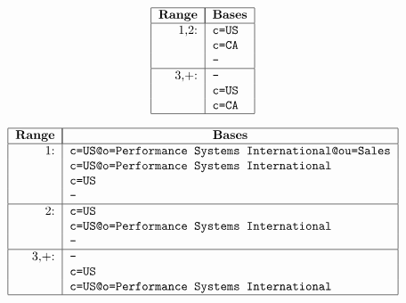 \begin{bwslide}

\[\begin{tabular}{|r|l|}
\hline
\multicolumn{1}{|c|}{\bf Range}&
		\multicolumn{1}{|c|}{\bf Bases}\\
\hline
1,2:&		\tt c=US\\
&		\tt c=CA\\
&		\tt -\\
\hline
3,+:&		\tt -\\
&		\tt c=US\\
&		\tt c=CA\\
\hline
\end{tabular}\]
\end{bwslide}


\begin{bwslide}

\[\begin{tabular}{|r|l|}
\hline
\multicolumn{1}{|c|}{\bf Range}&
		\multicolumn{1}{|c|}{\bf Bases}\\
\hline
1:&		\tt c=US@o=Performance Systems International@ou=Sales\\
&		\tt c=US@o=Performance Systems International\\
&		\tt c=US\\
&		\tt -\\
\hline
2:&		\tt c=US\\
&		\tt c=US@o=Performance Systems International\\
&		\tt -\\
\hline
3,+:&		\tt -\\
&		\tt c=US\\
&		\tt c=US@o=Performance Systems International\\
\hline
\end{tabular}\]
\end{bwslide}






